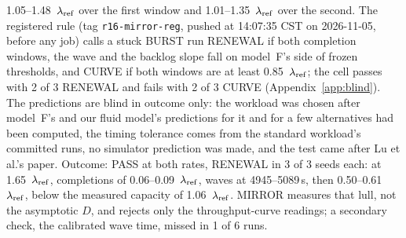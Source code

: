 1.05--1.48~$\lambda_{\mathrm{ref}}$ over the first window and 1.01--1.35~$\lambda_{\mathrm{ref}}$ over the second. The registered rule (tag \texttt{r16-mirror-reg},
pushed at 14:07:35 CST on 2026-11-05, before any job) calls a stuck BURST run RENEWAL if both completion windows, the wave and the
backlog slope fall on model~F's side of frozen thresholds, and CURVE if both windows are at least 0.85~$\lambda_{\mathrm{ref}}$; the cell passes with
2 of 3 RENEWAL and fails with 2 of 3 CURVE (Appendix~\ref{app:blind}). The predictions are blind in outcome only:
the workload was chosen after model~F's and our fluid model's predictions for it and for a few alternatives had been computed, the timing tolerance comes
from the standard workload's committed runs, no simulator prediction was made, and the test came after Lu et al.'s paper. Outcome:
PASS at both rates, RENEWAL in 3 of 3 seeds each: at 1.65~$\lambda_{\mathrm{ref}}$, completions of 0.06--0.09~$\lambda_{\mathrm{ref}}$, waves at 4945--5089\,s,
then 0.50--0.61~$\lambda_{\mathrm{ref}}$, below the measured capacity of 1.06~$\lambda_{\mathrm{ref}}$. MIRROR measures that lull, not the asymptotic $D$, and rejects only the throughput-curve readings; a
secondary check, the calibrated wave time, missed in 1 of 6 runs.
